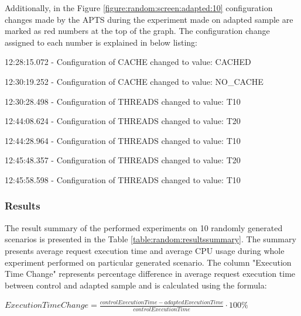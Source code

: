 \documentclass[12pt,a4paper]{article}
\let\tmpone\enumerate
\let\tmptwo\endenumerate
\renewenvironment{enumerate}{\tmpone\addtolength{\itemsep}{-0.4\baselineskip}}{\tmptwo}
\begin{document}
Additionally, in the Figure \ref{figure:random:screen:adapted:10} configuration changes made by the APTS during the experiment made on adapted sample are marked as red numbers at the top of the graph. The configuration change assigned to each number is explained in below listing: 

\begin{enumerate}
\item 12:28:15.072 - Configuration of CACHE changed to value: CACHED
\item 12:30:19.252 - Configuration of CACHE changed to value: NO\_CACHE
\item 12:30:28.498 - Configuration of THREADS changed to value: T10
\item 12:44:08.624 - Configuration of THREADS changed to value: T20
\item 12:44:28.964 - Configuration of THREADS changed to value: T10
\item 12:45:48.357 - Configuration of THREADS changed to value: T20
\item 12:45:58.598 - Configuration of THREADS changed to value: T10
\end{enumerate}

\subsubsection{Results} 

The result summary of the performed experiments on 10 randomly generated scenarios is presented in the Table \ref{table:random:resultssummary}. The summary presents average request execution time and average CPU usage during whole experiment performed on particular generated scenario. The column "Execution Time Change" represents percentage difference in average request execution time between control and adapted sample and is calculated using the formula:

\begin{center}
$Execution Time Change=\frac{controlExecutionTime-adaptedExecutionTime}{controlExecutionTime} \cdot 100\%$
\end{center}
\end{document}
